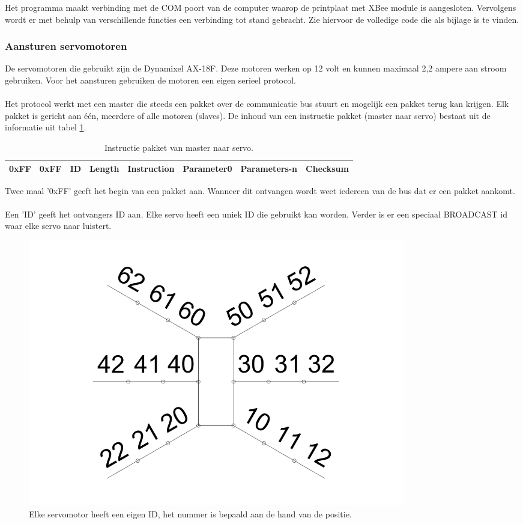 \documentclass[10pt,a4paper]{article}
\begin{document}
Het programma maakt verbinding met de COM poort van de computer waarop de printplaat met XBee module is aangesloten. Vervolgens wordt er met behulp van verschillende functies een verbinding tot stand gebracht. Zie hiervoor de volledige code die als bijlage is te vinden. 


\subsubsection{Aansturen servomotoren}
De servomotoren die gebruikt zijn de Dynamixel AX-18F. Deze motoren werken op 12 volt en kunnen maximaal 2,2 ampere aan stroom gebruiken.
Voor het aansturen gebruiken de motoren een eigen serieel protocol.\\\\
Het protocol werkt met een master die steeds een pakket over de communicatie bus stuurt en mogelijk een pakket terug kan krijgen. Elk pakket is gericht aan \'e\'en, meerdere of alle motoren (slaves).
De inhoud van een instructie pakket (master naar servo) bestaat uit de informatie uit tabel \ref{instructionpackage}.

\begin{table}[]
\centering
\caption{Instructie pakket van master naar servo.}
\label{instructionpackage}
\begin{tabular}{|l|l|l|l|l|l|l|l|}
\hline
0xFF & 0xFF & ID & Length & Instruction & Parameter0 & Parameters-n & Checksum \\ \hline
\end{tabular}
\end{table}

Twee maal '0xFF' geeft het begin van een pakket aan. Wanneer dit ontvangen wordt weet iedereen van de bus dat er een pakket aankomt.\\\\
Een 'ID' geeft het ontvangers ID aan. Elke servo heeft een uniek ID die gebruikt kan worden. Verder is er een speciaal BROADCAST id waar elke servo naar luistert.

\begin{figure}[h]
    \centering
    \includegraphics[width=0.8\textwidth]{hexapodid}
    \caption{Elke servomotor heeft een eigen ID, het nummer is bepaald aan de hand van de positie.}
    \label{fig:hexapodid}
\end{figure}
\end{document}
